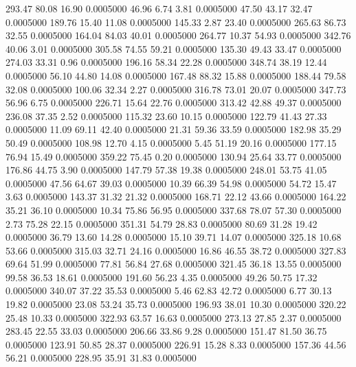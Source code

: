  293.47   80.08   16.90   0.0005000
  46.96    6.74    3.81   0.0005000
  47.50   43.17   32.47   0.0005000
 189.76   15.40   11.08   0.0005000
 145.33    2.87   23.40   0.0005000
 265.63   86.73   32.55   0.0005000
 164.04   84.03   40.01   0.0005000
 264.77   10.37   54.93   0.0005000
 342.76   40.06    3.01   0.0005000
 305.58   74.55   59.21   0.0005000
 135.30   49.43   33.47   0.0005000
 274.03   33.31    0.96   0.0005000
 196.16   58.34   22.28   0.0005000
 348.74   38.19   12.44   0.0005000
  56.10   44.80   14.08   0.0005000
 167.48   88.32   15.88   0.0005000
 188.44   79.58   32.08   0.0005000
 100.06   32.34    2.27   0.0005000
 316.78   73.01   20.07   0.0005000
 347.73   56.96    6.75   0.0005000
 226.71   15.64   22.76   0.0005000
 313.42   42.88   49.37   0.0005000
 236.08   37.35    2.52   0.0005000
 115.32   23.60   10.15   0.0005000
 122.79   41.43   27.33   0.0005000
  11.09   69.11   42.40   0.0005000
  21.31   59.36   33.59   0.0005000
 182.98   35.29   50.49   0.0005000
 108.98   12.70    4.15   0.0005000
   5.45   51.19   20.16   0.0005000
 177.15   76.94   15.49   0.0005000
 359.22   75.45    0.20   0.0005000
 130.94   25.64   33.77   0.0005000
 176.86   44.75    3.90   0.0005000
 147.79   57.38   19.38   0.0005000
 248.01   53.75   41.05   0.0005000
  47.56   64.67   39.03   0.0005000
  10.39   66.39   54.98   0.0005000
  54.72   15.47    3.63   0.0005000
 143.37   31.32   21.32   0.0005000
 168.71   22.12   43.66   0.0005000
 164.22   35.21   36.10   0.0005000
  10.34   75.86   56.95   0.0005000
 337.68   78.07   57.30   0.0005000
   2.73   75.28   22.15   0.0005000
 351.31   54.79   28.83   0.0005000
  80.69   31.28   19.42   0.0005000
  36.79   13.60   14.28   0.0005000
  15.10   39.71   14.07   0.0005000
 325.18   10.68   53.66   0.0005000
 315.03   32.71   24.16   0.0005000
  16.86   46.55   38.72   0.0005000
 327.83   69.64   51.99   0.0005000
  77.81   56.84   27.68   0.0005000
 321.45   36.18   13.55   0.0005000
  99.58   36.53   18.61   0.0005000
 191.60   56.23    4.35   0.0005000
  49.26   50.75   17.32   0.0005000
 340.07   37.22   35.53   0.0005000
   5.46   62.83   42.72   0.0005000
   6.77   30.13   19.82   0.0005000
  23.08   53.24   35.73   0.0005000
 196.93   38.01   10.30   0.0005000
 320.22   25.48   10.33   0.0005000
 322.93   63.57   16.63   0.0005000
 273.13   27.85    2.37   0.0005000
 283.45   22.55   33.03   0.0005000
 206.66   33.86    9.28   0.0005000
 151.47   81.50   36.75   0.0005000
 123.91   50.85   28.37   0.0005000
 226.91   15.28    8.33   0.0005000
 157.36   44.56   56.21   0.0005000
 228.95   35.91   31.83   0.0005000
